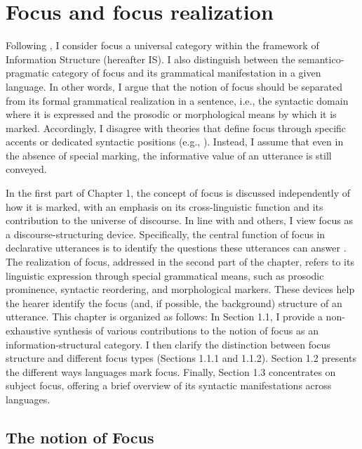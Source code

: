 \chapter{Focus and focus realization} \label{focusandfocusrealization} \label{sec:1}

Following \textcite{zimmermann2011focus}, I consider focus a universal category within the framework of Information Structure (hereafter IS). I also distinguish between the semantico-pragmatic category of focus and its grammatical manifestation in a given language.
In other words, I argue that the notion of focus should be separated from its formal grammatical realization in a sentence, i.e., the syntactic domain where it is expressed and the prosodic or morphological means by which it is marked. Accordingly, I disagree with theories that define focus through specific accents or dedicated syntactic positions (e.g., \cite{chomsky1970some, rizzi1997fine, brody1990some}). Instead, I assume that even in the absence of special marking, the informative value of an utterance is still conveyed.

In the first part of Chapter 1, the concept of focus is discussed independently of how it is marked, with an emphasis on its cross-linguistic function and its contribution to the universe of discourse. In line with \textcite{roberts1996information} and others, I view focus as a discourse-structuring device. Specifically, the central function of focus in declarative utterances is to identify the questions these utterances can answer \parencite{roberts1996information, buring2003d, beaver2009sense}.
The realization of focus, addressed in the second part of the chapter, refers to its linguistic expression through special grammatical means, such as prosodic prominence, syntactic reordering, and morphological markers. These devices help the hearer identify the focus (and, if possible, the background) structure of an utterance.
This chapter is organized as follows: In Section 1.1, I provide a non-exhaustive synthesis of various contributions to the notion of focus as an information-structural category. I then clarify the distinction between focus structure and different focus types (Sections 1.1.1 and 1.1.2). Section 1.2 presents the different ways languages mark focus. Finally, Section 1.3 concentrates on subject focus, offering a brief overview of its syntactic manifestations across languages.

\section{The notion of Focus} 

